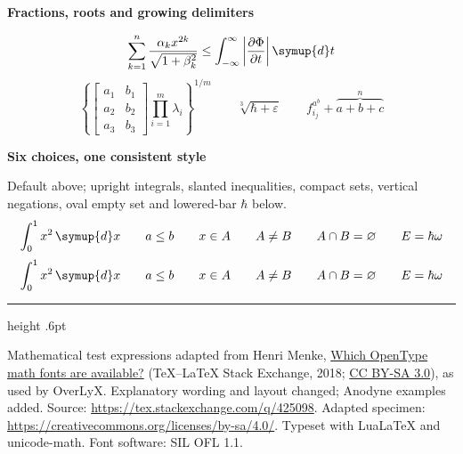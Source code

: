 \documentclass[border=22pt]{standalone}
\newcommand*\diff{\mathop{}\!\symup{d}}
\newcommand*\parttitle[2]{\par\vspace{13pt}{\color{rule}\hrule height .6pt}\vspace{9pt}
  {\color{accent}\fontsize{9}{12}\selectfont #1\quad}
  {\bfseries\fontsize{13}{16}\selectfont #2}\par\vspace{6pt}}
\begin{document}
\begin{minipage}{590pt}
\parttitle{04}{Fractions, roots and growing delimiters}
\[
 \sum_{k=1}^{n}\frac{\alpha_k x^{2k}}{\sqrt{1+\beta_k^2}}
 \leq\int_{-\infty}^{\infty}
 \left|\frac{\partial\Phi}{\partial t}\right|\diff t
\]
\[
 \left\{\left[\begin{matrix}a_1&b_1\\a_2&b_2\\a_3&b_3\end{matrix}\right]
 \prod_{i=1}^{m}\lambda_i\right\}^{1/m}
 \qquad\sqrt[3]{\hbar+\varepsilon}\qquad
 f^{a^b}_{i_j}+\overbrace{a+b+c}^{n}
\]

\parttitle{05}{Six choices, one consistent style}
{\color{muted}\fontsize{9}{12}\selectfont
Default above; upright integrals, slanted inequalities, compact sets, vertical
negations, oval empty set and lowered-bar $\hbar$ below.}
\[
 \int_0^1 x^2\diff x\qquad a\leq b\qquad x\in A\qquad A\ne B\qquad
 A\cap B=\varnothing\qquad E=\hbar\omega
\]
\begingroup{}\color{accent}
\[
 \int_0^1 x^2\diff x\qquad a\leq b\qquad x\in A\qquad A\ne B\qquad
 A\cap B=\varnothing\qquad E=\hbar\omega
\]
\endgroup
\vspace{7pt}
{\color{rule}\hrule height .6pt}\vspace{7pt}
{\color{muted}\fontsize{8}{11}\selectfont
Mathematical test expressions adapted from Henri Menke,
\href{https://tex.stackexchange.com/q/425098}{Which OpenType math fonts are available?}
(TeX--LaTeX Stack Exchange, 2018;
\href{https://creativecommons.org/licenses/by-sa/3.0/}{CC BY-SA 3.0}), as used by OverLyX.
Explanatory wording and layout changed; Anodyne examples added.
Source: \url{https://tex.stackexchange.com/q/425098}.
Adapted specimen: \url{https://creativecommons.org/licenses/by-sa/4.0/}.
Typeset with LuaLaTeX and unicode-math. Font software: SIL OFL 1.1.}
\end{minipage}
\end{document}
